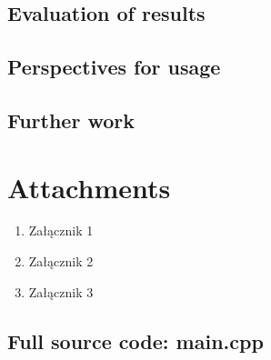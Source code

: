 \documentclass[12pt]{report}
\begin{document}
\section{Evaluation of results} 

\section{Perspectives for usage }



\section{Further work}

 


\printbibliography[heading=bibintoc]

\listoffigures

\listoftables


\chapter{Attachments}
\begin{enumerate}
\item Załącznik 1
\item Załącznik 2
\item Załącznik 3
\end{enumerate}

\section{Full source code: main.cpp}

\pagebreak 
\end{document}
